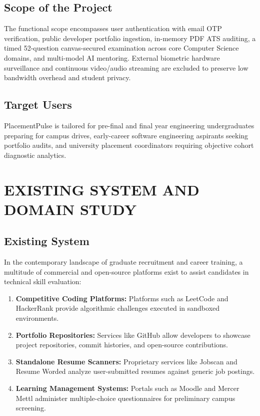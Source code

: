 \documentclass[12pt,a4paper]{report}
\begin{document}
\section{Scope of the Project}
The functional scope encompasses user authentication with email OTP verification, public developer portfolio ingestion, in-memory PDF ATS auditing, a timed 52-question canvas-secured examination across core Computer Science domains, and multi-model AI mentoring. External biometric hardware surveillance and continuous video/audio streaming are excluded to preserve low bandwidth overhead and student privacy.

\section{Target Users}
PlacementPulse is tailored for pre-final and final year engineering undergraduates preparing for campus drives, early-career software engineering aspirants seeking portfolio audits, and university placement coordinators requiring objective cohort diagnostic analytics.


\chapter{EXISTING SYSTEM AND DOMAIN STUDY}

\section{Existing System}
In the contemporary landscape of graduate recruitment and career training, a multitude of commercial and open-source platforms exist to assist candidates in technical skill evaluation:
\begin{enumerate}
    \item \textbf{Competitive Coding Platforms:} Platforms such as LeetCode and HackerRank provide algorithmic challenges executed in sandboxed environments.
    \item \textbf{Portfolio Repositories:} Services like GitHub allow developers to showcase project repositories, commit histories, and open-source contributions.
    \item \textbf{Standalone Resume Scanners:} Proprietary services like Jobscan and Resume Worded analyze user-submitted resumes against generic job postings.
    \item \textbf{Learning Management Systems:} Portals such as Moodle and Mercer Mettl administer multiple-choice questionnaires for preliminary campus screening.
\end{enumerate}
\end{document}
